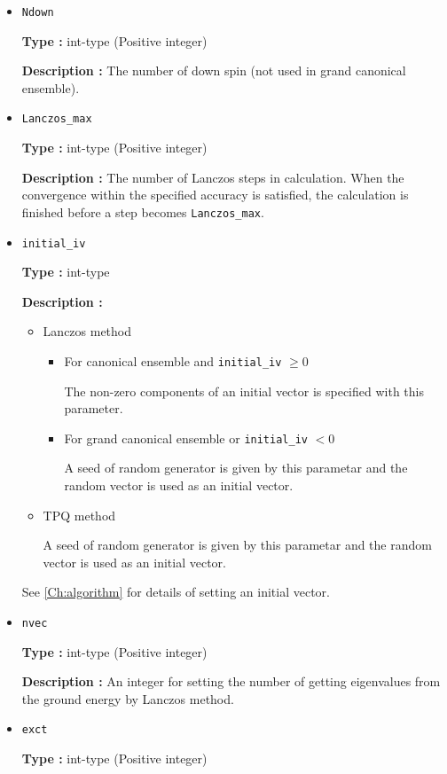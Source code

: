 \begin{itemize}
 \item  \verb|Ndown|

{\bf Type :} int-type (Positive integer)

{\bf Description :} The number of down spin (not used in grand canonical ensemble). 


 \item  \verb|Lanczos_max|

{\bf Type :} int-type (Positive integer)

{\bf Description :}  The number of Lanczos steps in calculation. When the convergence within the specified accuracy is satisfied, the calculation is finished before a step becomes  \verb|Lanczos_max|.

 \item  \verb|initial_iv|

{\bf Type :} int-type

{\bf Description :} 
\begin{itemize}
\item{Lanczos method}
\begin{itemize}
\item{For canonical ensemble and \verb|initial_iv| $\geq 0$}

The non-zero components of an initial vector is specified with this parameter. 

\item{For grand canonical ensemble or \verb|initial_iv| $< 0$}

A seed of random generator is given by this parametar and the random vector is used as an initial vector.
\end{itemize}

\item{TPQ method}

A seed of random generator is given by this parametar and the random vector is used as an initial vector.
\end{itemize}
See \ref{Ch:algorithm} for details of setting an initial vector.

 \item  \verb|nvec|

{\bf Type :} int-type (Positive integer)

{\bf Description :} An integer for setting the number of getting eigenvalues from the ground energy by Lanczos method.

 \item  \verb|exct|

{\bf Type :} int-type (Positive integer)


\end{itemize}
